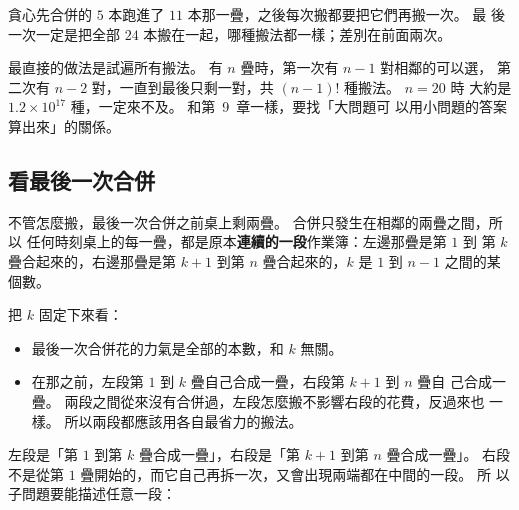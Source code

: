 貪心先合併的 $5$ 本跑進了 $11$ 本那一疊，之後每次搬都要把它們再搬一次。 最
後一次一定是把全部 $24$ 本搬在一起，哪種搬法都一樣；差別在前面兩次。

最直接的做法是試遍所有搬法。 有 $n$ 疊時，第一次有 $n - 1$ 對相鄰的可以選，
第二次有 $n - 2$ 對，一直到最後只剩一對，共 $(n - 1)!$ 種搬法。 $n = 20$ 時
大約是 $1.2 \times 10^{17}$ 種，一定來不及。 和第~9~章一樣，要找「大問題可
以用小問題的答案算出來」的關係。

\subsection{看最後一次合併}
\label{sec:ivdp-last}

不管怎麼搬，最後一次合併之前桌上剩兩疊。 合併只發生在相鄰的兩疊之間，所以
任何時刻桌上的每一疊，都是原本\textbf{連續的一段}作業簿：左邊那疊是第 $1$ 到
第 $k$ 疊合起來的，右邊那疊是第 $k + 1$ 到第 $n$ 疊合起來的，$k$ 是
$1$ 到 $n - 1$ 之間的某個數。

\begin{center}
\label{fig:ivdp-last}
\end{center}

把 $k$ 固定下來看：

\begin{itemize}
\item 最後一次合併花的力氣是全部的本數，和 $k$ 無關。
\item 在那之前，左段第 $1$ 到 $k$ 疊自己合成一疊，右段第 $k + 1$ 到 $n$ 疊自
己合成一疊。 兩段之間從來沒有合併過，左段怎麼搬不影響右段的花費，反過來也
一樣。 所以兩段都應該用各自最省力的搬法。
\end{itemize}

左段是「第 $1$ 到第 $k$ 疊合成一疊」，右段是「第 $k + 1$ 到第 $n$ 疊合成一疊」。
右段不是從第 $1$ 疊開始的，而它自己再拆一次，又會出現兩端都在中間的一段。 所
以子問題要能描述任意一段：

